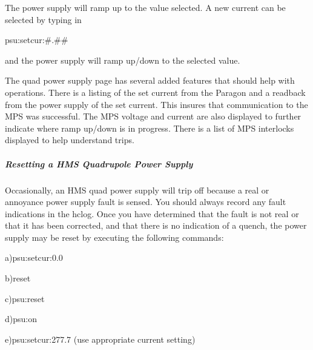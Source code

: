 {\begin{description}
\item{}\hskip0.3in The power supply will ramp up to the value selected.  A new
current can be selected by typing in
\end{description}

\begin{center}
psu:setcur:\#.\#\#
\end{center}

\begin{description}
\item{}\hskip0.3in and the power supply will ramp up/down to the selected value.
\medskip
\item{}\hskip0.3in The quad power supply page has several added features that
should help with operations.  There is a listing of the set current from the
Paragon and a readback from the power supply of the set current.  This
insures that communication to the MPS was successful.  The MPS voltage
and current are also displayed to further indicate where ramp up/down is
in progress.  There is a list of MPS interlocks displayed to help
understand trips.
\end{description}


\subparagraph{Resetting a HMS Quadrupole Power Supply}
\begin{description}
\item{}\hskip0.3in Occasionally, an HMS quad power supply will trip
off because a real or annoyance power supply fault is sensed. You
should always record any fault indications in the hclog. Once
you have determined that the fault is not real or that it has been
corrected, and that there is no indication of a quench, the power
supply may be reset by executing the following commands:
\end{description}

\begin{description}
\item{}\hskip0.5in a)psu:setcur:0.0
\item{}\hskip0.5in b)reset
\item{}\hskip0.5in c)psu:reset
\item{}\hskip0.5in d)psu:on
\item{}\hskip0.5in e)psu:setcur:277.7 (use appropriate current setting)
\end{description}

}

